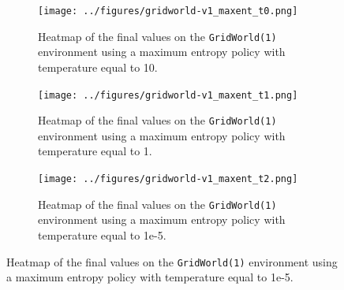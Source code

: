 \documentclass{article}
\begin{document}
\begin{enumerate}[(a)]
\begin{figure}[h!]
    \centering
    \begin{subfigure}{0.3\textwidth}
        \centering
        \texttt{[image: ../figures/gridworld-v1\_maxent\_t0.png]}
        \caption{Heatmap of the final values on the \texttt{GridWorld(1)} environment using a maximum entropy policy with temperature equal to 10.}
    \end{subfigure}
    \hspace{0.1 in}
    \begin{subfigure}{0.3\textwidth}
        \centering
        \texttt{[image: ../figures/gridworld-v1\_maxent\_t1.png]}
        \caption{Heatmap of the final values on the \texttt{GridWorld(1)} environment using a maximum entropy policy with temperature equal to 1.}
    \end{subfigure}
    \hspace{0.1 in}
     \begin{subfigure}{0.3\textwidth}
        \centering
        \texttt{[image: ../figures/gridworld-v1\_maxent\_t2.png]}
        \caption{Heatmap of the final values on the \texttt{GridWorld(1)} environment using a maximum entropy policy with temperature equal to 1e-5.}
    \end{subfigure}
\end{figure}


\end{enumerate}

\newpage
\end{document}
